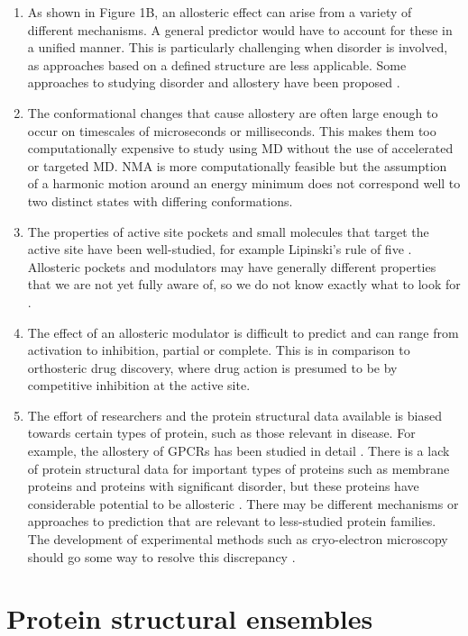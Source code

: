 \begin{enumerate}
\item As shown in Figure 1B, an allosteric effect can arise from a variety of different mechanisms.
A general predictor would have to account for these in a unified manner.
This is particularly challenging when disorder is involved, as approaches based on a defined structure are less applicable.
Some approaches to studying disorder and allostery have been proposed \cite{Singh2017, Wang2017}.
\item The conformational changes that cause allostery are often large enough to occur on timescales of microseconds or milliseconds.
This makes them too computationally expensive to study using MD without the use of accelerated or targeted MD.
NMA is more computationally feasible but the assumption of a harmonic motion around an energy minimum does not correspond well to two distinct states with differing conformations.
\item The properties of active site pockets and small molecules that target the active site have been well-studied, for example Lipinski's rule of five \cite{Lipinski2001}.
Allosteric pockets and modulators may have generally different properties that we are not yet fully aware of, so we do not know exactly what to look for \cite{VanWesten2014, Wang2012}.
\item The effect of an allosteric modulator is difficult to predict and can range from activation to inhibition, partial or complete.
This is in comparison to orthosteric drug discovery, where drug action is presumed to be by competitive inhibition at the active site.
\item The effort of researchers and the protein structural data available is biased towards certain types of protein, such as those relevant in disease.
For example, the allostery of GPCRs has been studied in detail \cite{Wootten2013, Conn2009}.
There is a lack of protein structural data for important types of proteins such as membrane proteins and proteins with significant disorder, but these proteins have considerable potential to be allosteric \cite{Motlagh2014}.
There may be different mechanisms or approaches to prediction that are relevant to less-studied protein families.
The development of experimental methods such as cryo-electron microscopy should go some way to resolve this discrepancy \cite{Ozorowski2017}.
\end{enumerate}


\section{Protein structural ensembles}
\label{sec:introduction_ensembles}

